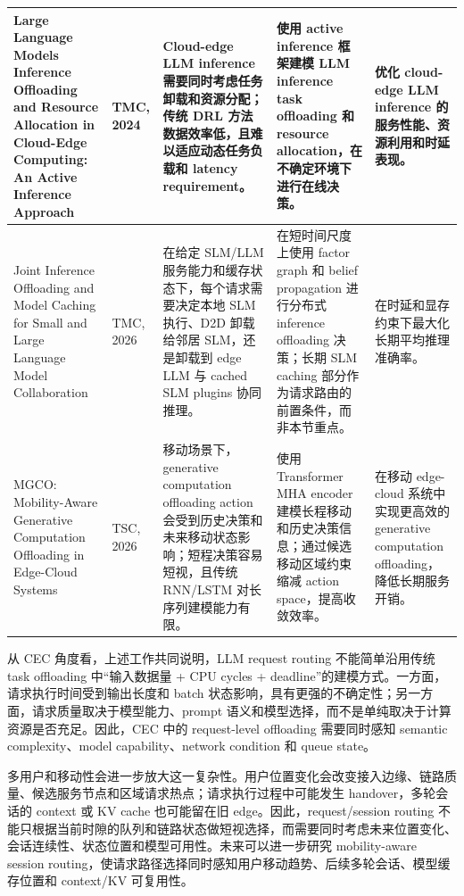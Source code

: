 \documentclass[a4paper,10pt]{ctexart}
\begin{document}
\begin{table}[H]
\begin{tabularx}{\textwidth}{|X|X|X|X|X|}
Large Language Models Inference Offloading and Resource Allocation in Cloud-Edge Computing: An Active Inference Approach & TMC, 2024 & Cloud-edge LLM inference 需要同时考虑任务卸载和资源分配；传统 DRL 方法数据效率低，且难以适应动态任务负载和 latency requirement。 & 使用 active inference 框架建模 LLM inference task offloading 和 resource allocation，在不确定环境下进行在线决策。 & 优化 cloud-edge LLM inference 的服务性能、资源利用和时延表现。 \\ \hline
Joint Inference Offloading and Model Caching for Small and Large Language Model Collaboration & TMC, 2026 & 在给定 SLM/LLM 服务能力和缓存状态下，每个请求需要决定本地 SLM 执行、D2D 卸载给邻居 SLM，还是卸载到 edge LLM 与 cached SLM plugins 协同推理。 & 在短时间尺度上使用 factor graph 和 belief propagation 进行分布式 inference offloading 决策；长期 SLM caching 部分作为请求路由的前置条件，而非本节重点。 & 在时延和显存约束下最大化长期平均推理准确率。 \\ \hline
MGCO: Mobility-Aware Generative Computation Offloading in Edge-Cloud Systems & TSC, 2026 & 移动场景下，generative computation offloading action 会受到历史决策和未来移动状态影响；短程决策容易短视，且传统 RNN/LSTM 对长序列建模能力有限。 & 使用 Transformer MHA encoder 建模长程移动和历史决策信息；通过候选移动区域约束缩减 action space，提高收敛效率。 & 在移动 edge-cloud 系统中实现更高效的 generative computation offloading，降低长期服务开销。 \\ \hline
\end{tabularx}
\end{table}


从 CEC 角度看，上述工作共同说明，LLM request routing 不能简单沿用传统 task offloading 中“输入数据量 + CPU cycles + deadline”的建模方式。一方面，请求执行时间受到输出长度和 batch 状态影响，具有更强的不确定性；另一方面，请求质量取决于模型能力、prompt 语义和模型选择，而不是单纯取决于计算资源是否充足。因此，CEC 中的 request-level offloading 需要同时感知 semantic complexity、model capability、network condition 和 queue state。


多用户和移动性会进一步放大这一复杂性。用户位置变化会改变接入边缘、链路质量、候选服务节点和区域请求热点；请求执行过程中可能发生 handover，多轮会话的 context 或 KV cache 也可能留在旧 edge。因此，request/session routing 不能只根据当前时隙的队列和链路状态做短视选择，而需要同时考虑未来位置变化、会话连续性、状态位置和模型可用性。未来可以进一步研究 mobility-aware session routing，使请求路径选择同时感知用户移动趋势、后续多轮会话、模型缓存位置和 context/KV 可复用性。
\end{document}
